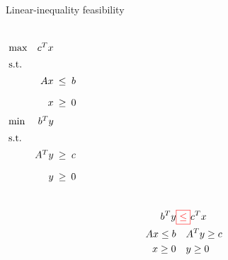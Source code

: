 \begin{frame}{Linear-inequality feasibility}
  \begin{columns}
	  \begin{equation*}
		\setlength\arraycolsep{2.5pt}
		\begin{array}{l@{\quad}rcc}
		  \max 	& c^{T}x	&	&	\\[5pt]
		  \text{s.t.} 	&	&	&	\\[5pt]
				&	Ax 	&	\leq	&	b	\\[10pt]
				&	x	& 	\geq 	&	0	
		\end{array}
	  \end{equation*}
	  \begin{equation*}
		\setlength\arraycolsep{2.5pt}
		\begin{array}{l@{\quad}rcc}
		  \min 	& b^{T}y	&	&	\\[5pt]
		  \text{s.t.} 	&	&	&	\\[5pt]
				&	A^{T}y 	&	\geq	&	c	\\[10pt]
				&	y	& 	\geq 	&	0	
		\end{array}
	  \end{equation*}
  \end{columns}

  \begin{align*}
	b^{T} y &\textcolor{red}{\boxed{\leq}} c^{T} x	\\
	Ax \leq b	&	\quad	A^{T} y \geq c	\\
	x \geq 0	&	\quad 	y \geq 0
  \end{align*}
\end{frame}
